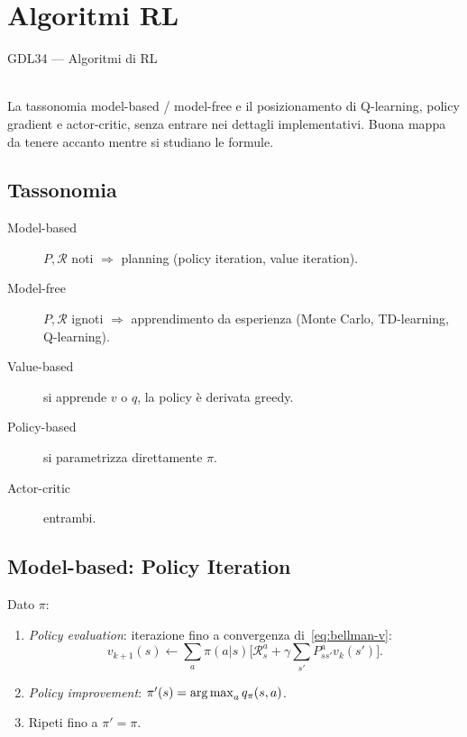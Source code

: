 \chapter{Algoritmi RL}

\begin{risorsevideo}{GDL34 — Algoritmi di RL}

\medskip
{}\\
La tassonomia model-based / model-free e il posizionamento di Q-learning, policy gradient e actor-critic, senza entrare nei dettagli implementativi. Buona mappa da tenere accanto mentre si studiano le formule.
\end{risorsevideo}
\label{ch:rl-algos}

\section{Tassonomia}

\begin{description}
  \item[Model-based] $P, \mathcal{R}$ noti $\Rightarrow$ planning (policy iteration, value iteration).
  \item[Model-free] $P, \mathcal{R}$ ignoti $\Rightarrow$ apprendimento da esperienza (Monte Carlo, TD-learning, Q-learning).
  \item[Value-based] si apprende $v$ o $q$, la policy è derivata greedy.
  \item[Policy-based] si parametrizza direttamente $\pi$.
  \item[Actor-critic] entrambi.
\end{description}

\section{Model-based: Policy Iteration}

Dato $\pi$:
\begin{enumerate}
  \item \emph{Policy evaluation}: iterazione fino a convergenza di~\eqref{eq:bellman-v}:
  \[
  v_{k+1}(s) \leftarrow \sum_a \pi(a|s) \Big[\mathcal{R}^a_s + \gamma \sum_{s'} P^a_{ss'} v_k(s')\Big].
  \]
  \item \emph{Policy improvement}: $\pi'(s) = \operatorname*{arg\,max}_a q_\pi(s, a)$.
  \item Ripeti fino a $\pi' = \pi$.
\end{enumerate}

